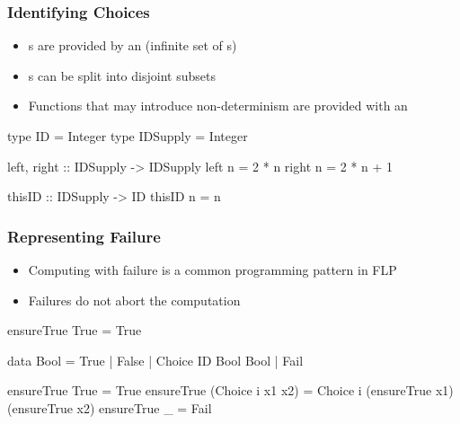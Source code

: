 \documentclass[
,hyperref={pdfpagelabels=false}
]{beamer}
\begin{document}
\begin{frame}[fragile]%
\frametitle{Identifying Choices}
\begin{itemize}
 \item {}s are provided by an 
       (infinite set of s)
 \item {}s can be split into disjoint subsets
 \item Functions that may introduce non-determinism
       are provided with an 
\end{itemize}

\begin{haskell} 
type ID = Integer
type IDSupply = Integer

left, right :: IDSupply -> IDSupply
left  n = 2 * n
right n = 2 * n + 1

thisID :: IDSupply -> ID
thisID n = n
\end{haskell}
\end{frame}

\begin{frame}[fragile]%
\frametitle{Representing Failure}
\begin{itemize}
 \item Computing with failure is a common programming pattern in FLP
 \item Failures do not abort the computation
\end{itemize}

\begin{curry}
ensureTrue True = True
\end{curry}

\begin{haskell}
data Bool = True | False | Choice ID Bool Bool \alert{| Fail}

ensureTrue True             = True
ensureTrue (Choice i x1 x2) = Choice i (ensureTrue x1)
                                       (ensureTrue x2)
\alert{ensureTrue _                = Fail}
\end{haskell}
\end{frame}
\end{document}
